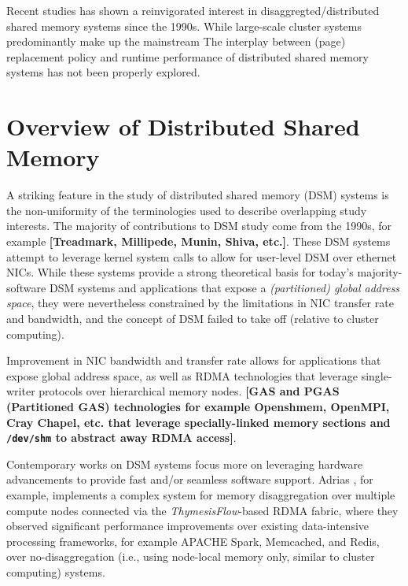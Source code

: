 \documentclass{article}
\begin{document}
Recent studies has shown a reinvigorated interest in disaggregted/distributed
shared memory systems since the 1990s. While large-scale cluster systems
predominantly make up the mainstream
The interplay between (page) replacement policy and runtime performance of
distributed shared memory systems has not been properly explored.

\section{Overview of Distributed Shared Memory}

A striking feature in the study of distributed shared memory (DSM) systems is the
non-uniformity of the terminologies used to describe overlapping study interests.
The majority of contributions to DSM study come from the 1990s, for example
\textbf{[Treadmark, Millipede, Munin, Shiva, etc.]}. These DSM systems attempt to
leverage kernel system calls to allow for user-level DSM over ethernet NICs. While
these systems provide a strong theoretical basis for today's majority-software
DSM systems and applications that expose a \emph{(partitioned) global address space},
they were nevertheless constrained by the limitations in NIC transfer rate and
bandwidth, and the concept of DSM failed to take off (relative to cluster computing).

Improvement in NIC bandwidth and transfer rate allows for applications that expose
global address space, as well as RDMA technologies that leverage single-writer
protocols over hierarchical memory nodes. \textbf{[GAS and PGAS (Partitioned GAS)
technologies for example Openshmem, OpenMPI, Cray Chapel, etc. that leverage
specially-linked memory sections and \texttt{/dev/shm} to abstract away RDMA access]}.


Contemporary works on DSM systems focus more on leveraging hardware advancements
to provide fast and/or seamless software support. Adrias \cite{Masouros_etal.Adrias.2023},
for example, implements a complex system for memory disaggregation over multiple
compute nodes connected via the \textit{ThymesisFlow}-based RDMA fabric, where
they observed significant performance improvements over existing data-intensive
processing frameworks, for example APACHE Spark, Memcached, and Redis, over
no-disaggregation (i.e., using node-local memory only, similar to cluster computing)
systems.
\end{document}
